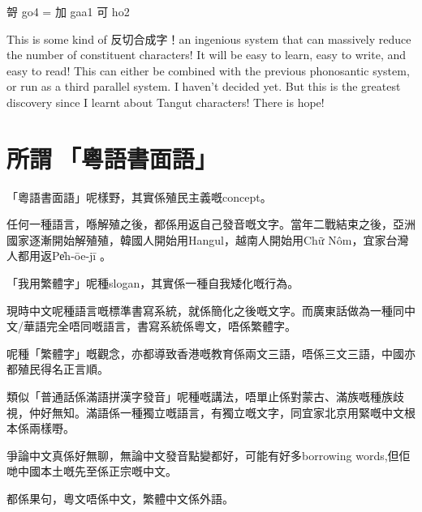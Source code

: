 哿 go4 = 加 gaa1 可 ho2

This is some kind of 反切合成字！an ingenious system that can massively reduce the number of constituent characters! It will be easy to learn, easy to write, and easy to read! This can either be combined with the previous phonosantic system, or run as a third parallel system. I haven't decided yet. But this is the greatest discovery since I learnt about Tangut characters! There is hope!




\section{所謂󱝚「粵語書面語」}

「粵語書面語」呢樣野，其實係殖民主義嘅concept。

任何一種語言，喺解殖之後，都係用返自己發音嘅文字。當年二戰結束之後，亞洲國家逐漸開始解殖殖，韓國人開始用Hangul，越南人開始用Chữ Nôm，宜家台灣人都用返Pe̍h-ōe-jī 。

「我用繁體字」呢種slogan，其實係一種自我矮化嘅行為。

現時中文呢種語言嘅標準書寫系統，就係簡化之後嘅文字。而廣東話做為一種同中文/華語完全唔同嘅語言，書寫系統係粵文，唔係繁體字。

呢種「繁體字」嘅觀念，亦都導致香港嘅教育係兩文三語，唔係三文三語，中國亦都殖民得名正言順。

類似「普通話係滿語拼漢字發音」呢種嘅講法，唔單止係對蒙古、滿族嘅種族歧視，仲好無知。滿語係一種獨立嘅語言，有獨立嘅文字，同宜家北京用緊嘅中文根本係兩樣嘢。

爭論中文真係好無聊，無論中文發音點變都好，可能有好多borrowing words,但佢哋中國本土嘅先至係正宗嘅中文。

都係果句，粵文唔係中文，繁體中文係外語。